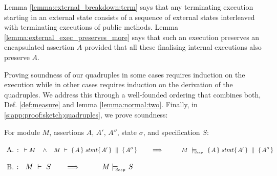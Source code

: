 Lemma \ref{lemma:external_breakdown:term} %
says that any terminating execution 
 starting in an external state  consists of a  sequence of  external states interleaved with terminating executions
  of public methods.
Lemma  \ref{lemma:external_exec_preserves_more} says that such an execution preserves an encapsulated assertion $A$  
provided that all these finalising internal executions  %
also preserve $A$.
% 
  



Proving soundness of our quadruples in  some cases  requires  induction on the execution while in other cases  requires induction on the derivation of the quadruples.  We address this   through  a well-founded ordering that combines both, \cf 
\label{sect:prove:wellfounded}
\label{sect:prove:sound:quadruples}
  Def.  \ref{def:measure}  and  lemma \ref{lemma:normal:two}. 
  Finally, in \ref{s:app:proof:sketch;quadruples}, we prove soundness:
 

\begin{theorem}
\label{t:quadruple:sound}
\label{thm:soundness}
For module  $M$,   assertions $A$, $A'$, $A''$,   state  $\sigma$, and specification $S$:

\begin{enumerate}[(A)]
\item
 $:\strut \   \vdash M  \ \ \ \wedge \ \ \  M\ \vdash\  \quadruple {A} {stmt} {A'} {A''}  \ \ \ \ \ \ \ \Longrightarrow \ \ \ \ \ \  \ \ \  M\ \modelsD\  \quadruple {A} {stmt} {A'} {A''}$
 \item
  $:\strut \  \  \proves{M}{S}\ \ \ \ \ \ \Longrightarrow\ \ \ \ \ \  \ \ \ {M} \modelsD {S}$
 
\end{enumerate}

\end{theorem}

